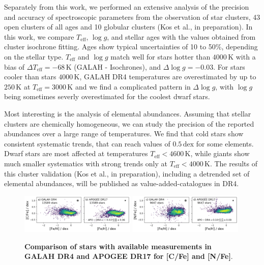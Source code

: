\documentclass[
  journal=pasa,
  manuscript=research-paper, %
  year=2024,
  volume=37
]{cup-journal}
\newcommand{\Teff}{$T_\mathrm{eff}$\xspace}
\newcommand{\logg}{$\log g$\xspace}
\begin{document}
Separately from this work, we performed an extensive analysis of the precision and accuracy of spectroscopic parameters from the observation of star clusters, 43 open clusters of all ages and 10 globular clusters (Kos et al., in preparation). In this work, we compare \Teff, \logg, and stellar ages with the values obtained from cluster isochrone fitting. Ages show typical uncertainties of 10 to 50\%, depending on the stellar type. \Teff and \logg match well for stars hotter than $4000\,\mathrm{K}$ with a bias of $\Delta T_\mathrm{eff}=-68\,\mathrm{K}$ (GALAH - Isochrones), and $\Delta \log g = -0.03$. For stars cooler than stars $4000\,\mathrm{K}$, GALAH DR4 temperatures are overestimated by up to $250\,\mathrm{K}$ at $T_\mathrm{eff} = 3000\,\mathrm{K}$ and we find a complicated pattern in $\Delta \log g$, with \logg being sometimes severly overestimated for the coolest dwarf stars. 

Most interesting is the analysis of elemental abundances. Assuming that stellar clusters are chemically homogeneous, we can study the precision of the reported abundances over a large range of temperatures. We find that cold stars show consistent systematic trends, that can reach values of $0.5\,\mathrm{dex}$ for some elements. Dwarf stars are most affected at temperatures $T_\mathrm{eff} < 4600\,\mathrm{K}$, while giants show much smaller systematics with strong trends only at $T_\mathrm{eff} < 4000\,\mathrm{K}$. The results of this cluster validation (Kos et al., in preparation), including a detrended set of elemental abundances, will be published as value-added-catalogues in DR4.

\begin{figure}[ht]
 \centering
 \includegraphics[width=0.49\textwidth]{figures/comparison_dr4_apo17_C_fe.png}
 \includegraphics[width=0.49\textwidth]{figures/comparison_dr4_apo17_N_fe.png}
 \caption{\textbf{Comparison of stars with available measurements in GALAH DR4 and APOGEE DR17 for [C/Fe] and [N/Fe]}.}
 \label{fig:comparison_dr4_apo17}
\end{figure}
\end{document}
